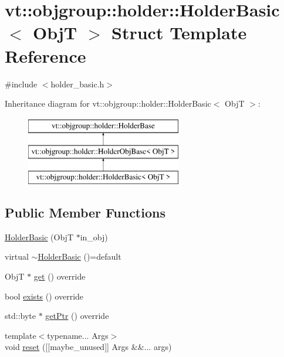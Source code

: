 \hypertarget{structvt_1_1objgroup_1_1holder_1_1_holder_basic}{}\section{vt\+:\+:objgroup\+:\+:holder\+:\+:Holder\+Basic$<$ ObjT $>$ Struct Template Reference}
\label{structvt_1_1objgroup_1_1holder_1_1_holder_basic}


{\ttfamily \#include $<$holder\+\_\+basic.\+h$>$}

Inheritance diagram for vt\+:\+:objgroup\+:\+:holder\+:\+:Holder\+Basic$<$ ObjT $>$\+:\begin{figure}[H]
\begin{center}
\leavevmode
\includegraphics[height=3.000000cm]{structvt_1_1objgroup_1_1holder_1_1_holder_basic}
\end{center}
\end{figure}
\subsection*{Public Member Functions}
\begin{DoxyCompactItemize}
\item 
\hyperlink{structvt_1_1objgroup_1_1holder_1_1_holder_basic_a0e74a9b5eb928c8d9cdaf81dd0994d7b}{Holder\+Basic} (ObjT $\ast$in\+\_\+obj)
\item 
virtual \hyperlink{structvt_1_1objgroup_1_1holder_1_1_holder_basic_a7446aae8de5ccb8e9cceee2143ca29ea}{$\sim$\+Holder\+Basic} ()=default
\item 
ObjT $\ast$ \hyperlink{structvt_1_1objgroup_1_1holder_1_1_holder_basic_af1d605b64e5f9d77d4b291c402133f3f}{get} () override
\item 
bool \hyperlink{structvt_1_1objgroup_1_1holder_1_1_holder_basic_ab52459a275afea84f6650d206fe5b3dc}{exists} () override
\item 
std\+::byte $\ast$ \hyperlink{structvt_1_1objgroup_1_1holder_1_1_holder_basic_a857b56b22964a3524169f6fa30307d65}{get\+Ptr} () override
\item 
{\footnotesize template$<$typename... Args$>$ }\\void \hyperlink{structvt_1_1objgroup_1_1holder_1_1_holder_basic_a8595e53a2006f9b0156712054fc1602c}{reset} (\mbox{[}\mbox{[}maybe\+\_\+unused\mbox{]}\mbox{]} Args \&\&... args)
\end{DoxyCompactItemize}
